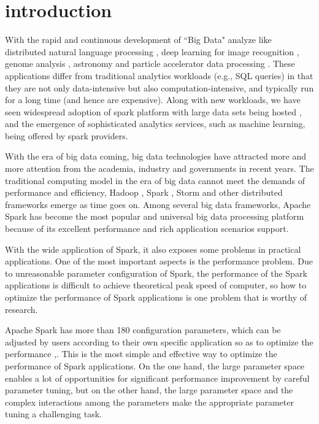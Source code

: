 \section{introduction}
\par With the rapid and continuous development of ``Big Data" analyze like distributed natural language processing \cite{TT2007Largelanguage}, deep learning for image recognition \cite{dean2012Large}, genome analysis \cite{L2010cloudcomputing}, astronomy \cite{Berriman2010application} and particle accelerator data processing \cite{bird2011}. These applications differ from traditional analytics workloads (e.g., SQL queries) in that they are not only data-intensive but also computation-intensive, and typically run for a long time (and hence are expensive). Along with new workloads, we have seen widespread adoption of spark platform with large data sets being hosted \cite{commoncrawlurl}, and the emergence of sophisticated analytics services, such as machine learning, being offered by spark providers\cite{Machinelearningurl}.

\par With the era of big data coming, big data technologies have attracted more and more attention from the academia, industry and governments in recent years. The traditional computing model in the era of big data cannot meet the demands of performance and efficiency, Hadoop \cite{apachehadoop}, Spark \cite{apachespark}, Storm \cite{apachestorm} and other distributed frameworks emerge as time goes on. Among several big data frameworks, Apache Spark has become the most popular and universal big data processing platform because of its excellent performance and rich application scenarios support.

\par With the wide application of Spark, it also exposes some problems in practical applications. One of the most important aspects is the performance problem. Due to unreasonable parameter configuration of Spark, the performance of the Spark applications is difficult to achieve theoretical peak speed of computer, so how to optimize the performance of Spark applications is one problem that is worthy of research.

\par Apache Spark has more than 180 configuration parameters, which can be adjusted by users according to their own specific application so as to optimize the performance \cite{apachespark},. This is the most simple and effective way to optimize the performance of Spark applications. On the one hand, the large parameter space enables a lot of opportunities for significant performance improvement by careful parameter tuning, but on the other hand, the large parameter space and the complex interactions among the parameters make the appropriate parameter tuning a challenging task.

